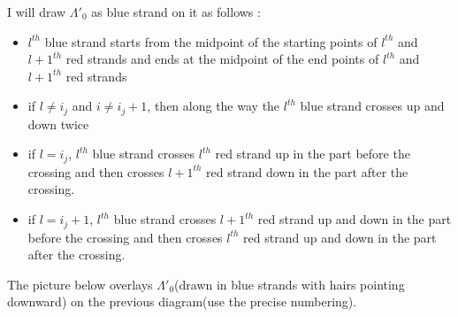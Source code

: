 I will draw $\Lambda'_0$ as blue strand on it as follows :

\begin{itemize}
\item $l^{th}$ blue strand starts from the midpoint of the starting points of $l^{th}$ and $l+1^{th}$ red strands and ends at the midpoint of the end points of $l^{th}$ and $l+1^{th}$ red strands

\item if $l \neq i_j$ and $i\neq i_j +1$, then along the way the $l^{th}$ blue strand crosses up and down twice

\item if $l = i_j$, $l^{th}$ blue strand crosses $l^{th}$ red strand up in the part before the crossing and then crosses $l+1^{th}$ red strand down in the part after the crossing.

\item if $l = i_j + 1$, $l^{th}$ blue strand crosses $l+1^{th}$ red strand up and down in the part before the crossing and then crosses $l^{th}$ red strand up and down in the part after the crossing.
\end{itemize}

The picture below overlays $\Lambda'_0$(drawn in blue strands with hairs pointing downward) on the previous diagram(use the precise numbering).

